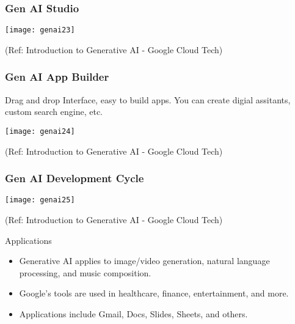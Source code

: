 \begin{frame}[fragile]\frametitle{Gen AI Studio}

\begin{center}
\texttt{[image: genai23]}
\end{center}


{\tiny (Ref: Introduction to Generative AI - Google Cloud Tech)}

\end{frame}


\begin{frame}[fragile]\frametitle{Gen AI App Builder}

Drag and drop Interface, easy to build apps. You can create digial assitants, custom search engine, etc.

\begin{center}
\texttt{[image: genai24]}
\end{center}


{\tiny (Ref: Introduction to Generative AI - Google Cloud Tech)}

\end{frame}

\begin{frame}[fragile]\frametitle{Gen AI Development Cycle}

\begin{center}
\texttt{[image: genai25]}
\end{center}


{\tiny (Ref: Introduction to Generative AI - Google Cloud Tech)}

\end{frame}


\begin{frame}[fragile]{Applications}
\begin{itemize}
\item Generative AI applies to image/video generation, natural language processing, and music composition.
\item Google's tools are used in healthcare, finance, entertainment, and more.
\item Applications include Gmail, Docs, Slides, Sheets, and others.
\end{itemize}
\end{frame}

